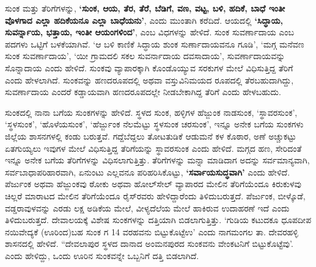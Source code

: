 ಸುಂಕ ಮತ್ತು ತೆರಿಗೆಗಳನ್ನು, \textbf{‘ಸುಂಕ, ಆಯ, ತೆರ, ತೆರೆ, ಬೆಡಿಗೆ, ವಣ, ವಟ್ಟ, ಬಳಿ, ಹದಿಕೆ, ಬಾಧೆ ಇಂತೀ ವೊಳಗಾದ ಎಲ್ಲಾ ಹದಿಕೆಯನೂ ಎಲ್ಲಾ ಬಾಧೆಯನು’}, ಎಂದು ಮುಂತಾಗಿ ಕರೆದಿದೆ. ಆಯದಲ್ಲಿ \textbf{‘ಸಿದ್ಧಾಯ, ಸುವರ್ನ್ನಾಯ, ಭತ್ತಾಯ, ಇಂತೀ ಆಯಂಗಳಿಂದ’}, ಎಂಬ ವಿಧಗಳನ್ನು ಹೇಳಿದೆ. ಸುಂಕ ಸುವರ್ಣಾದಾಯ ಎಂಬ ಪದಗಳು ಒಟ್ಟಿಗೆ ಬಳಕೆಯಾಗಿವೆ. ‘ಆ ಬಳಿ ಕಾಣಿಕೆ ಸಿದ್ಧಾಯ ಶುಂಕ ಸುರ್ಣಾದಾಯವನೂ ಗೂಡಿ’, ‘ಮಗ್ಗ ಮನೆವಣ ಸುಂಕ ಸುವರ್ಣಾದಾಯ’, ‘ಯೀ ಗ್ರಾಮದಲಿ ಸಕಲ ಸುವರ್ನಾದಾಯ ದವಸಾದಾಯ’, ಸುವರ್ಣಾದಾಯವನ್ನು ಸೊನ್ನಾದಾಯ ಎಂದು ಹೇಳಿದೆ. ಸುಂಕವು ವ್ಯಾಪಾರಕ್ಕಾಗಿ ಕೊಂಡೊಯ್ಯುವ ಸರಕುಗಳ ಮೇಲೆ ವಿಧಿಸುತ್ತಿದ್ದ ತೆರಿಗೆ ಎಂದು ಹೇಳಲಾಗಿದೆ. ಸುಂಕವನ್ನು ಹಣದರೂಪದಲ್ಲಿ ಅಥವಾ ವಸ್ತುವಿನಿಮಯದ ರೂಪದಲ್ಲಿ ತೆರಬಹುದಾಗಿದ್ದು, ಸುವರ್ಣಾದಾಯ ಎಂದರೆ ಕಡ್ಡಾಯವಾಗಿ ಹಣದರೂಪದಲ್ಲೇ ನೀಡಬೇಕಾಗಿದ್ದ ತೆರಿಗೆ ಎಂದು ಹೇಳಬಹುದು.

ಸುಂಕದಲ್ಲಿ ನಾನಾ ಬಗೆಯ ಸುಂಕಗಳನ್ನು ಹೇಳಿದೆ. ಸ್ಥಳದ ಸುಂಕ, ಹಳ್ಳಿಗಳ ಹೆಜ್ಜುಂಕ ನಾಡಸುಂಕ, ‘ಸ್ಥಾವರಸುಂಕ’, ‘ಸ್ಥಳಸುಂಕ’, ‘ಹೊಳೆಯಸುಂಕ’, ‘ಹೆರ್ಜ್ಜುಂಕ ನೆಲಮೆಟ್ಟು ಸ್ಥಳಸುಂಕ ಚರಸುಂಕ’, ಇನ್ನೂ ಅನೇಕ ಬಗೆಯ ಸುಂಕಗಳು ಜಿಲ್ಲೆಯ ಶಾಸನಗಳಲ್ಲಿ ಕಂಡು ಬರುತ್ತವೆ. ಗದ್ದೆಬೆದ್ದಲು ತೋಟತುಡಿಕೆ ಆಡುಮನೆ ಕಳ ಕೊಠಾರ, ಅಣೆ ಅಚ್ಚುಕಟ್ಟು ಏತಗುಯ್ಯಲು ಇವುಗಳ ಮೇಲೆ ವಿಧಿಸುತ್ತಿದ್ದ ತೆರಿಗೆಯನ್ನು ಸ್ಥಾವರಸುಂಕ ಎಂದು ಹೇಳಿದೆ. ಮಗ್ಗದ ಹಣ, ಸೇರಿದಂತೆ ಇನ್ನೂ ಅನೇಕ ಬಗೆಯ ತೆರಿಗೆಗಳನ್ನು ವಿಧಿಸಲಾಗುತ್ತಿತ್ತು. ತೆರಿಗೆಗಳನ್ನು ಮನ್ನಾ ಮಾಡಿದಾಗ ಅದನ್ನು ಸರ್ವಮಾನ್ಯವಾಗಿ, ಸರ್ವಬಾಧಾಪರಿಹಾರವಾಗಿ, ಏನುಂಟು ಎಲ್ಲವನೂ ಪರಿಹರಿಸಿಕೊಟ್ಟು, \textbf{‘ಸರ್ವಾಯಸುದ್ಧವಾಗಿ’} ಎಂದು ಹೇಳಿದೆ. ಪೆರ್ಜುಂಕ ಅಥವಾ ಹೆಜ್ಜುಂಕವು ಠೋಕು ಅಥವಾ ಹೋಲ್​ಸೇಲ್​ ವ್ಯಾಪಾರದ ಮೇಲಿನ ತೆರಿಗೆಯೆಂದೂ ಕಿರುಕುಳವು ಚಿಲ್ಲರೆ ಮಾರಾಟದ ಮೇಲಿನ ತೆರಿಗೆಯೆಂದೂ ರೈಸ್​ರವರು ಹೇಳಿದ್ದಾರೆಂದು ತಿಳಿದುಬರುತ್ತದೆ. ಪೆರ್ಜುಂಕ, ಬೀಳ್ಕೊಡೆ, ವಡ್ಡರಾವುಳವನ್ನು ಎರಡು ಲಕ್ಷ ಅಡಿಕೆಯ ಮೇಲೆ, ವೀಳ್ಯದೆಲೆಯ ಮೇಲೆ ಹಾಕಿರುವ ಉದಾಹರಣೆ ಇದೆ ಎಂದು ತಿಳಿದುಬರುತ್ತದೆ. ದೇವಾಲಯಕ್ಕೆ ವಿಶೇಷ ಸುಂಕಗಳನ್ನು ದತ್ತಿಯಾಗಿ ಬಿಡಲಾಗುತ್ತಿತ್ತು. ‘ಗುಡಿಯ ಕಟುದಕೂ ಧೂಪದೀಪ ನಯಿವೇದ್ಯಕೆ (ಊರಿಂದ)ಬಹ ಸುಂಕ ಗ 14 ವರಹವನು ಬಿಟ್ಟುಕೊಟ್ಟೆಉ’ ಎಂದು ನಾಗಮಂಗಲ ತಾ. ದೇವರಹಳ್ಳಿ ಶಾಸನದಲ್ಲಿ ಹೇಳಿದೆ. “ದೇವಲಾಪುರ ಸ್ಥಳದ ದಾನಾದ ಅಂಮನಪುರದ ಸುಂಕವನು ವೇಂಕಟನಿಗೆ ಬಿಟ್ಟುಕೊಟ್ಟೆವು’. ಎಂದು ಹೇಳಿದ್ದು, ಒಂದು ಊರಿನ ಸುಂಕವನ್ನೇ ಒಬ್ಬನಿಗೆ ದತ್ತಿ ಬಿಡಲಾಗಿದೆ.

